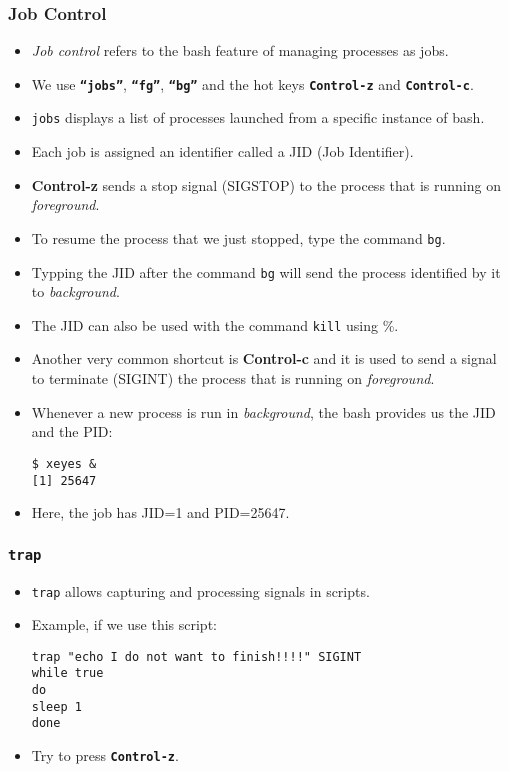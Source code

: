 
\begin{frame}\frametitle{Job Control}
\begin{itemize}
\item \textit{Job control} refers to the bash feature of managing processes as jobs.
\item We use \textbf{\texttt{``jobs''}}, \textbf{\texttt{``fg''}},  \textbf{\texttt{``bg''}} 
and the hot keys \textbf{\texttt{Control-z}} and \textbf{\texttt{Control-c}}.
\item \texttt{jobs} displays a list of processes launched from a specific instance of bash. 
\item Each job is assigned an identifier called a JID (Job Identifier).
\item \textbf{Control-z} sends a stop signal (SIGSTOP) to the process that is running on \textit{foreground}. 
\item To resume the process that we just stopped, type the command \texttt{bg}.
\item Typping the JID after the command \texttt{bg} will send the process identified by it to \textit{background}. 
\item The JID can also be used with the command \texttt{kill} using \%.
\item Another very common shortcut is \textbf{Control-c} and it is used to send a
signal to terminate (SIGINT) the process that is running on
\textit{foreground}. 
\item Whenever a new process is run in \textit{background}, the bash provides us
the JID and the PID:
\begin{lstlisting}
$ xeyes &
[1] 25647 
\end{lstlisting}
\item Here, the job has JID=1 and PID=25647.
\end{itemize}
\end{frame}

\begin{frame}[fragile]\frametitle{\texttt{trap}}
\begin{itemize}
\item \texttt{trap} allows capturing and processing signals in scripts.
\item Example, if we use this script:

\begin{lstlisting}[style=scriptStyle]
trap "echo I do not want to finish!!!!" SIGINT
while true
do
sleep 1
done
\end{lstlisting}
\item Try to press \texttt{\textbf{Control-z}}.
\end{itemize}
\end{frame}

